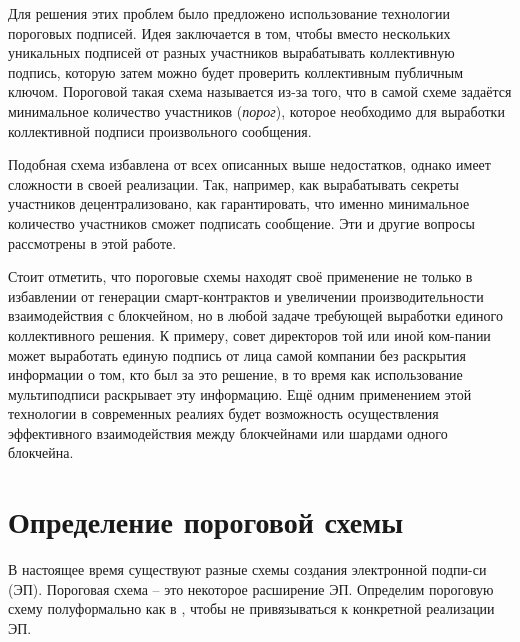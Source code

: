 \documentclass[a4paper,12pt]{article}
\theoremstyle{definition}
\begin{document}
	Для решения этих проблем было предложено использование технологии пороговых подписей. Идея заключается в том, чтобы вместо нескольких уникальных подписей от разных участников вырабатывать коллективную подпись, которую затем можно будет проверить коллективным публичным ключом. Пороговой такая схема называется из-за того, что в самой схеме задаётся минимальное количество участников (\emph{порог}), которое необходимо для выработки коллективной подписи произвольного сообщения.
	
	Подобная схема избавлена от всех описанных выше недостатков, однако имеет сложности в своей реализации. Так, например, как вырабатывать секреты участников децентрализовано, как гарантировать, что именно минимальное количество участников сможет подписать сообщение. Эти и другие вопросы рассмотрены в этой работе.
	
	Стоит отметить, что пороговые схемы находят своё применение не только в избавлении от генерации смарт-контрактов и увеличении производительности взаимодействия с блокчейном, но в любой задаче требующей выработки единого коллективного решения. К примеру, совет директоров той или иной ком-пании может выработать единую подпись от лица самой компании без раскрытия информации о том, кто был за это решение, в то время как использование мультиподписи раскрывает эту информацию. Ещё одним применением этой технологии в современных реалиях будет возможность осуществления эффективного взаимодействия между блокчейнами или шардами одного блокчейна.
	
	
	\section{Определение пороговой схемы}
	
	В настоящее время существуют разные схемы создания электронной подпи-си (ЭП). Пороговая схема \--- это некоторое расширение ЭП. Определим пороговую схему полуформально как в \cite{paper1}, чтобы не привязываться к конкретной реализации ЭП.
		
\end{document}
